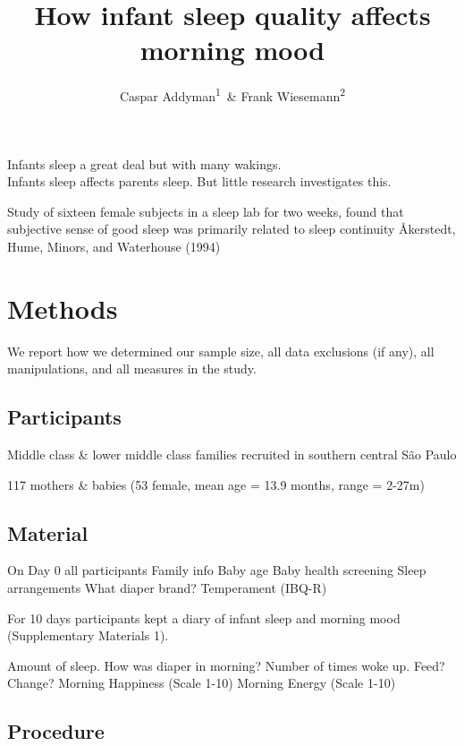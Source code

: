 \documentclass[man,floatsintext]{apa6}
\title{How infant sleep quality affects morning mood}
\author{Caspar Addyman\textsuperscript{1}~\& Frank Wiesemann\textsuperscript{2}}
\date{}
\affiliation{
\vspace{0.5cm}
\textsuperscript{1} Goldsmiths, University of London\\\textsuperscript{2} R\&D Baby Care, Procter \& Gamble}
\begin{document}
\maketitle

Infants sleep a great deal but with many wakings.\\
Infants sleep affects parents sleep. But little research investigates this.

Study of sixteen female subjects in a sleep lab for two weeks, found that subjective sense of good sleep was primarily related to sleep continuity Åkerstedt, Hume, Minors, and Waterhouse (1994)

\hypertarget{methods}{%
\section{Methods}\label{methods}}

We report how we determined our sample size, all data exclusions (if any), all manipulations, and all measures in the study.

\hypertarget{participants}{%
\subsection{Participants}\label{participants}}

Middle class \& lower middle class families
recruited in southern central São Paulo

117 mothers \& babies (53 female,
mean age = 13.9 months, range = 2-27m)

\hypertarget{material}{%
\subsection{Material}\label{material}}

On Day 0 all participants
Family info
Baby age
Baby health screening
Sleep arrangements
What diaper brand?
Temperament (IBQ-R)

For 10 days participants kept a diary of infant sleep and morning mood (Supplementary Materials 1).

Amount of sleep.
How was diaper in morning?
Number of times woke up.
Feed? Change?
Morning Happiness (Scale 1-10)
Morning Energy (Scale 1-10)

\hypertarget{procedure}{%
\subsection{Procedure}\label{procedure}}
\end{document}
